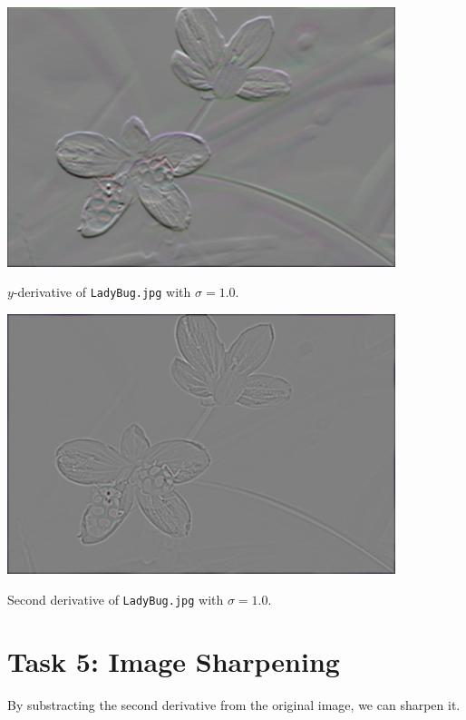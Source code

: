 \documentclass[letterpaper]{article}
\begin{document}
\begin{center}
  \includegraphics[width=0.85\textwidth]{task4b.png}
  
  $y$-derivative of \texttt{LadyBug.jpg} with $\sigma = 1.0$.
\end{center}

\begin{center}
  \includegraphics[width=0.85\textwidth]{task4c.png}
  
  Second derivative of \texttt{LadyBug.jpg} with $\sigma = 1.0$.
\end{center}

\section*{Task 5: Image Sharpening}

By substracting the second derivative from the original image, we can sharpen
it.
\end{document}
